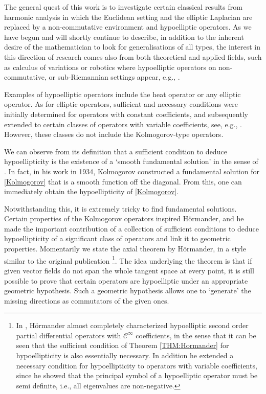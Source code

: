 \documentclass[12pt,oneside,a4paper]{book}
\numberwithin{equation}{section}     %
\theoremstyle{plain}
\theoremstyle{definition}
\begin{document}
The general quest of this work is to investigate certain classical results from harmonic analysis in which the Euclidean setting and the elliptic Laplacian are replaced by a non-commutative environment and hypoelliptic operators. As we have begun and will shortly continue to describe, in addition to the inherent desire of the mathematician to look for generalisations of all types, the interest in this direction of research comes also from both theoretical and applied fields, such as calculus of variations or robotics where hypoelliptic operators on non-commutative, or sub-Riemannian settings appear, e.g., \cite{CS2014,M1993}.

Examples of hypoelliptic operators include the heat operator or any elliptic operator. As for elliptic operators, sufficient and necessary conditions were initially determined for operators with constant coefficients, and subsequently extended to certain classes of operators with variable coefficients, see, e.g., \cite{H1990}. However, these classes do not include the Kolmogorov-type operators. 

We can observe from its definition that a sufficient condition to deduce hypoellipticity is the existence of a `smooth fundamental solution' in the sense of \cite[Theorem 11.1.1]{H1990}. In fact, in his work in 1934, Kolmogorov constructed a fundamental solution for \eqref{Kolmogorov} that is a smooth function off the diagonal. From this, one can immediately obtain the hypoellipticity of \eqref{Kolmogorov}. 

Notwithstanding this, it is extremely tricky to find fundamental solutions. Certain properties of the Kolmogorov operators inspired H\"ormander, and he made the important contribution of a collection of sufficient conditions to deduce hypoellipticity of a significant class of operators and link it to geometric properties. Momentarily we state the axial theorem by H\"ormander, in a style similar to the original publication \cite[Theorem 1.1]{H1967}\footnote{In \cite{H1967}, H\"ormander almost completely characterized hypoelliptic second order partial differential operators with $\mathcal{C}^{\infty}$ coefficients, in the sense that it can be seen that the sufficient condition of Theorem \ref{THM:Hormander} for hypoellipticity is also essentially necessary. In addition he extended a necessary condition for hypoellipticity to operators with variable coefficients, since he showed that the principal symbol of a hypoelliptic operator must be semi definite, i.e., all eigenvalues are non-negative.}. The idea underlying the theorem is that if given vector fields do not span the whole tangent space at every point, it is still possible to prove that certain operators are hypoelliptic under an appropriate geometric hypothesis. Such a geometric hypothesis allows one to `generate' the missing directions as commutators of the given ones. 
\end{document}
